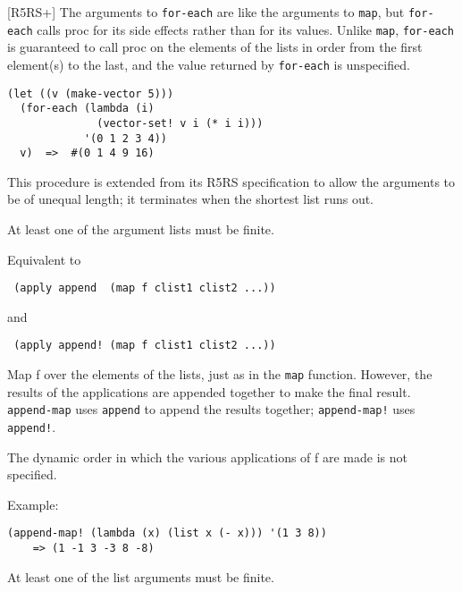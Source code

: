 \begin{entry}{%
  }

  {[}R5RS+{]} The arguments to
  \texttt{for-each} are like the arguments to \texttt{map}, but
  \texttt{for-each} calls proc for its side effects rather than for
  its values. Unlike \texttt{map}, \texttt{for-each} is guaranteed to
  call proc on the elements of the lists in order from the first
  element(s) to the last, and the value returned by \texttt{for-each}
  is unspecified.

\begin{verbatim}
(let ((v (make-vector 5)))
  (for-each (lambda (i)
              (vector-set! v i (* i i)))
            '(0 1 2 3 4))
  v)  =>  #(0 1 4 9 16)
\end{verbatim}

  This procedure is extended from its R5RS specification to allow the
  arguments to be of unequal length; it terminates when the shortest
  list runs out.

  At least one of the argument lists must be finite.
\end{entry}

\begin{entry}{%
  }

  Equivalent to

  \texttt{\ (apply\ append\ \ (map\ f\ clist1\ clist2\ ...))}

  and

  \texttt{\ (apply\ append!\ (map\ f\ clist1\ clist2\ ...))}

  Map f over the elements of the lists, just as in the \texttt{map}
  function. However, the results of the applications are appended
  together to make the final result. \texttt{append-map} uses
  \texttt{append} to append the results together; \texttt{append-map!}
  uses \texttt{append!}.

  The dynamic order in which the various applications of f are made is
  not specified.

  Example:

\begin{verbatim}
(append-map! (lambda (x) (list x (- x))) '(1 3 8))
    => (1 -1 3 -3 8 -8)
\end{verbatim}

  At least one of the list arguments must be finite.
\end{entry}

